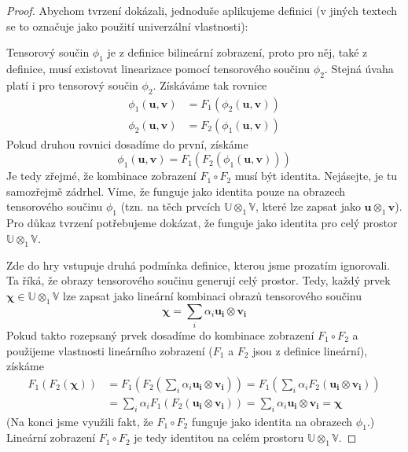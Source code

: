 \documentclass[a5paper,12pt]{amsbook}
\theoremstyle{definition}
\newcommand{\myvec}[1]{\bm{#1}}
\newcommand{\myspace}[1]{\mathbb{#1}}
\begin{document}
\begin{proof}
Abychom tvrzení dokázali, jednoduše aplikujeme definici (v jiných textech se to označuje jako
použití univerzální vlastnosti):
\begin{center}

\end{center}
Tensorový součin $\phi_1$ je z definice bilineární zobrazení, proto pro něj, také z definice, musí
existovat linearizace pomocí tensorového součinu $\phi_2$. Stejná úvaha platí i pro tensorový součin
$\phi_2$. Získáváme tak rovnice
\begin{equation*}
\begin{split}
\phi_1(\myvec{u}, \myvec{v}) &= F_1(\phi_2(\myvec{u}, \myvec{v})) \\
\phi_2(\myvec{u}, \myvec{v}) &= F_2(\phi_1(\myvec{u}, \myvec{v}))
\end{split}
\end{equation*}
Pokud druhou rovnici dosadíme do první, získáme
\begin{equation*}
\phi_1(\myvec{u}, \myvec{v}) = F_1(F_2(\phi_1(\myvec{u}, \myvec{v})))
\end{equation*}
Je tedy zřejmé, že kombinace zobrazení $F_1 \circ F_2$ musí být identita. Nejásejte, je tu samozřejmě
zádrhel. Víme, že funguje jako identita pouze na obrazech tensorového součinu $\phi_1$
(tzn. na těch prvcích $\myspace{U}\otimes_1\myspace{V}$, které lze zapsat jako
$\myvec{u}\otimes_1\myvec{v}$). Pro důkaz tvrzení potřebujeme dokázat, že funguje jako identita
pro celý prostor $\myspace{U}\otimes_1\myspace{V}$.

Zde do hry vstupuje druhá podmínka definice, kterou jsme prozatím ignorovali. Ta říká, že obrazy
tensorového součinu generují celý prostor. Tedy, každý prvek $\myvec{\chi}\in\myspace{U}\otimes_1\myspace{V}$
lze zapsat jako lineární kombinaci obrazů tensorového součinu
\begin{equation*}
\myvec{\chi} =  \sum_{i}\alpha_i\myvec{u_i}\otimes\myvec{v_i}
\end{equation*}
Pokud takto rozepsaný prvek dosadíme do kombinace zobrazení $F_1 \circ F_2$ a použijeme vlastnosti
lineárního zobrazení ($F_1$ a $F_2$ jsou z definice lineární), získáme
\begin{equation*}
\begin{split}
F_1(F_2(\myvec{\chi})) &= F_1(F_2(\sum_{i}\alpha_i\myvec{u_i}\otimes\myvec{v_i}))
  = F_1(\sum_{i}\alpha_i F_2(\myvec{u_i}\otimes\myvec{v_i})) \\
  &= \sum_{i}\alpha_i F_1(F_2(\myvec{u_i}\otimes\myvec{v_i}))
  = \sum_{i}\alpha_i\myvec{u_i}\otimes\myvec{v_i} = \myvec{\chi}
\end{split}
\end{equation*}
(Na konci jsme využili fakt, že $F_1 \circ F_2$ funguje jako identita na obrazech $\phi_1$.)
Lineární zobrazení $F_1 \circ F_2$ je tedy identitou na celém prostoru
$\myspace{U}\otimes_1\myspace{V}$.


\end{proof}
\end{document}
